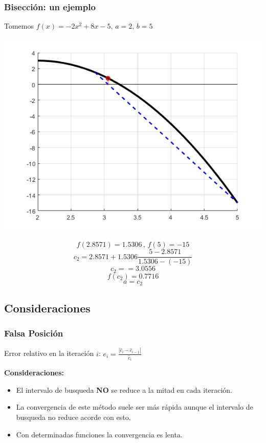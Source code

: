 \documentclass[xcolor=svgnames]{beamer} %
\theoremstyle{plain}
\renewcommand{\textbf}[1]{{\bfseries\textcolor{redUnq2}{#1}}}
\theoremstyle{definition}
\begin{document}
\begin{frame}
\frametitle{Bisección: un ejemplo}
Tomemos $f(x) = -2x^2+8x-5, \, a=2, \, b=5$
\begin{minipage}{.7\linewidth}
\includegraphics[scale=.5]{FalsaPosicion/f3.png} 
\end{minipage}
\begin{minipage}{.25\linewidth}
$$f(2.8571)=1.5306 \,,\,f(5)=-15$$\vspace{7pt}
$$c_2 = 2.8571 +1.5306\frac{5-2.8571}{1.5306-(-15)}$$
$$c_2 = = 3.0556 $$
$$f(c_2) = 0.7716 $$\vspace{7pt}
$$ a = c_2$$

\end{minipage}
\end{frame}

\subsection{Consideraciones}

\begin{frame}
\frametitle{Falsa Posición}

Error relativo en la iteración $i$: $e_i = \frac{|\hat c_i-\hat c_{i-1}|}{\hat c_i} $

\pause
\textbf{Consideraciones:}
\begin{itemize}
  \item El intervalo de busqueda \textbf{NO} se reduce a la mitad en cada iteración.
  \pause
  \item La convergencia de este método suele ser más rápida aunque el intervalo de   busqueda no reduce acorde con esto.
  \pause
  \item Con determinadas funciones la convergencia es lenta.
\end{itemize}

\end{frame}
\end{document}
